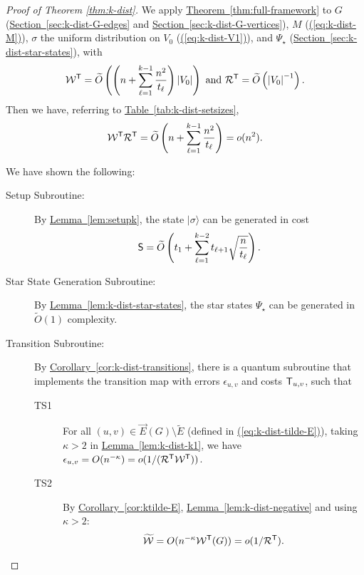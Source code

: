 \documentclass{theoretics}
\newcommand{\eq}[1]{\hyperref[eq:#1]{(\ref*{eq:#1})}}
\renewcommand{\sec}[1]{\hyperref[sec:#1]{Section~\ref*{sec:#1}}}
\newcommand{\thm}[1]{\hyperref[thm:#1]{Theorem~\ref*{thm:#1}}}
\newcommand{\lem}[1]{\hyperref[lem:#1]{Lemma~\ref*{lem:#1}}}
\newcommand{\cor}[1]{\hyperref[cor:#1]{Corollary~\ref*{cor:#1}}}
\newcommand{\tabl}[1]{\hyperref[tab:#1]{Table~\ref*{tab:#1}}}
\def\ket#1{{\lvert}#1\rangle}
\renewcommand{\>}{\rangle}
\newcommand{\<}{\langle}
\renewcommand{\(}{\left(}
\renewcommand{\)}{\right)}
\def\abs#1{\left| #1 \right|}
\begin{document}
\begin{proof}[Proof of Theorem \ref{thm:k-dist}]
	We apply \thm{full-framework} to $G$ (\sec{k-dist-G-edges} and \sec{k-dist-G-vertices}), $M$ (\eq{k-dist-M}),  $\sigma$ the uniform distribution on $V_0$ (\eq{k-dist-V1}), and $\Psi_\star$ (\sec{k-dist-star-states}), with 
	$${\cal W}^{\sf T}=\widetilde{O}\left(\left(n  + \sum_{\ell=1}^{k-1} \frac{n^2}{t_{\ell}}\right)\abs{V_0}\right)
	\mbox{ and }
	{\cal R}^{\sf T}=\widetilde{O}\left(\abs{V_0}^{-1} \right).$$
	Then we have, referring to \tabl{k-dist-setsizes},
	$${\cal W}^{\sf T}{\cal R}^{\sf T} = \widetilde{O}\left(n  + \sum_{\ell=1}^{k-1} \frac{n^2}{t_{\ell}}\right)=o(n^2).$$
	
	\noindent We have shown the following:
	\begin{description}
		\item[Setup Subroutine:] By \lem{setupk}, the state $\ket{\sigma}$ can be generated in cost 
		$${\sf S}=\widetilde{O}\left(t_1+\sum_{\ell=1}^{k-2}t_{\ell+1}\sqrt{\frac{n}{t_{\ell}}}\right).$$
		\item[Star State Generation Subroutine:] By \lem{k-dist-star-states}, the star states ${\Psi_\star}$ can be generated in $\widetilde{O}(1)$ complexity.
		\item[Transition Subroutine:] By \cor{k-dist-transitions}, there is a quantum subroutine that implements the transition map with errors $\epsilon_{u,v}$ and costs ${\sf T}_{u,v}$, such that
		\begin{description}
			\item[TS1] For all $(u,v)\in \overrightarrow{E}(G)\setminus \tilde{E}$ (defined in \eq{k-dist-tilde-E}), taking $\kappa>2$ in \lem{k-dist-k1}, we have $\epsilon_{u,v}
			=O(n^{-\kappa})=o(1/({\cal R}^{\sf T}{\cal W}^{\sf T}))$.
			\item[TS2] By \cor{ktilde-E}, \lem{k-dist-negative} and using $\kappa > 2$:
			\begin{align*}
				\widetilde{\cal W} = O(n^{-\kappa}{\cal W}^{\sf T}(G)) = o(1/{\cal R}^{\sf T}).
			\end{align*}
			
		\end{description}
		

\end{description}
\end{proof}
\end{document}
